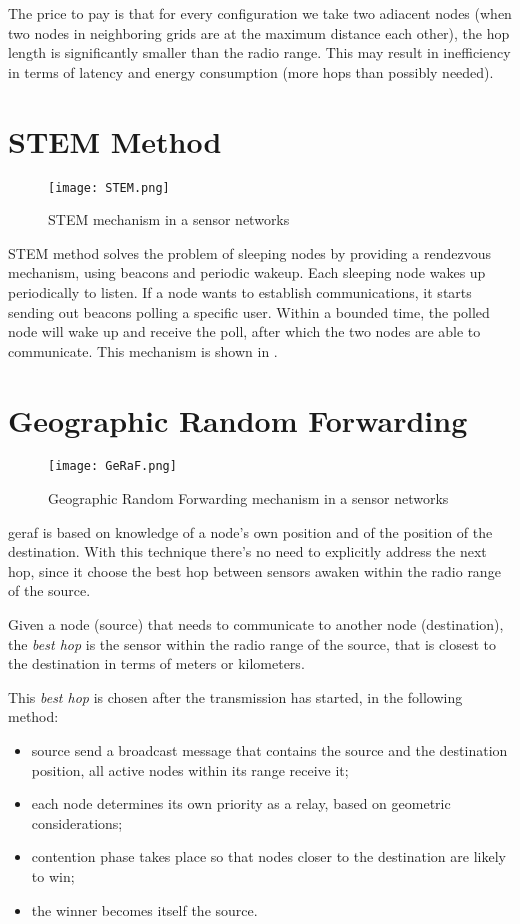 The price to pay is that for every configuration we take two adiacent nodes (when two nodes in neighboring grids are at the maximum distance each other), the hop length is significantly smaller than the radio range. This may result in inefficiency in terms of latency and energy consumption (more hops than possibly needed).

\section{STEM Method}
\begin{figure}[h]
	\centering
	\texttt{[image: STEM.png]}
	\caption{STEM mechanism in a sensor networks}
	\label{fig:STEM}
\end{figure}
STEM method solves the problem of sleeping nodes by providing a rendezvous mechanism, using beacons and periodic wakeup.
Each sleeping node wakes up periodically to listen. If a node wants to establish communications, it starts sending out beacons polling a specific user. Within a bounded time, the polled node will wake up and receive the poll, after which the two nodes are able to communicate. This mechanism is shown in .

\section{Geographic Random Forwarding}
\begin{figure}[h]
	\centering
	\texttt{[image: GeRaF.png]}
	\caption{Geographic Random Forwarding mechanism in a sensor networks}
	\label{fig:GeRaF}
\end{figure}
\gls{geraf} is based on knowledge of a node’s own position and of the position of the destination.
With this technique there's no need to explicitly address the next hop, since it choose the best hop between sensors awaken within the radio range of the source.

Given a node (source) that needs to communicate to another node (destination), the \textit{best hop} is the sensor within the radio range of the source, that is closest to the destination in terms of meters or kilometers.

This \textit{best hop} is chosen after the transmission has started, in the following method:
\begin{itemize}
	\item source send a broadcast message that contains the source and the destination position, all active nodes within its range receive it;
	\item each node determines its own priority as a relay, based on geometric considerations;
	\item contention phase takes place so that nodes closer to the destination are likely to win;
	\item the winner becomes itself the source.
\end{itemize}


